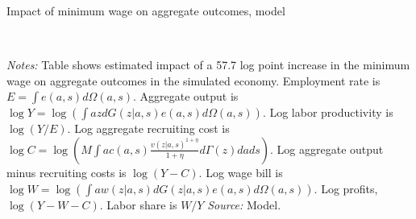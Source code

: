 \begin{table}[!htb]
 \begin{footnotesize}
  \centering
  \caption{Impact of minimum wage on aggregate outcomes, model\label{table: impact of minimum wage on aggregates}}
  \\
  \posttabvspace
  \begin{minipage}[t]{1\columnwidth}%
    \begin{spacing}{0.75}
      {\scriptsize \textit{Notes:} Table shows estimated impact of a 57.7 log point increase in the minimum wage on aggregate outcomes in the simulated economy. Employment rate is $E = \int e(a,s) d\Omega(a,s)$. Aggregate output is $\log Y = \log \left( \int azdG(z|a,s)e(a,s)d\Omega(a,s) \right)$. Log labor productivity is $\log (Y/E)$. Log aggregate recruiting cost is $\log C = \log \left( M \int a c(a,s) \frac{v(z|a,s)^{1+\eta}}{1+\eta} d\Gamma(z)dads\right)$. Log aggregate output minus recruiting costs is $\log (Y-C)$. Log wage bill is $\log W = \log \left( \int a w(z|a,s)dG(z|a,s)e(a,s)d\Omega(a,s)\right)$. Log profits, $\log(Y-W-C)$. Labor share is $W/Y$ %
      \textit{Source:} Model.}
    \end{spacing}
  \end{minipage}
 \end{footnotesize}
\end{table}


